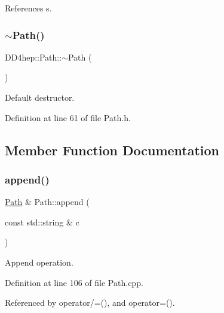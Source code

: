References s.

\hypertarget{class_d_d4hep_1_1_path_ac39064d1578702ce969c7b1e1bcb5912}{}\label{class_d_d4hep_1_1_path_ac39064d1578702ce969c7b1e1bcb5912} 
\subsubsection{\texorpdfstring{$\sim$\+Path()}{~Path()}}
{\footnotesize\ttfamily D\+D4hep\+::\+Path\+::$\sim$\+Path (\begin{DoxyParamCaption}{ }\end{DoxyParamCaption})\hspace{0.3cm}{\ttfamily [inline]}}



Default destructor. 



Definition at line 61 of file Path.\+h.



\subsection{Member Function Documentation}
\hypertarget{class_d_d4hep_1_1_path_aede85dabc3b61fe22482f3fcf4fd8fad}{}\label{class_d_d4hep_1_1_path_aede85dabc3b61fe22482f3fcf4fd8fad} 
\subsubsection{\texorpdfstring{append()}{append()}}
{\footnotesize\ttfamily \hyperlink{class_d_d4hep_1_1_path}{Path} \& Path\+::append (\begin{DoxyParamCaption}\item[{const std\+::string \&}]{c }\end{DoxyParamCaption})}



Append operation. 



Definition at line 106 of file Path.\+cpp.



Referenced by operator/=(), and operator=().

\hypertarget{class_d_d4hep_1_1_path_a45c39db50b5fd9be06a5554f8d6b294e}{}\label{class_d_d4hep_1_1_path_a45c39db50b5fd9be06a5554f8d6b294e} 
